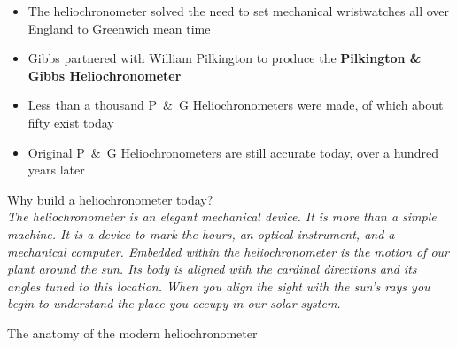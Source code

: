 \documentclass[final]{beamer}
\begin{document}
\begin{frame}
\begin{columns}[t]
\begin{column}[t]{0.24 \textwidth}
\begin{itemize}
\item The heliochronometer solved the need to set mechanical
  wristwatches all over England to Greenwich mean time 

\begin{center}
\end{center}

\item Gibbs partnered with William Pilkington to produce the 
{\bf Pilkington \& Gibbs Heliochronometer}


\item Less than a thousand \mbox{P \& G} Heliochronometers were
  made, of which about fifty exist today

\item Original \mbox{P \& G} Heliochronometers are still accurate today, over a hundred years later
\end{itemize}

\vspace*{.5in}

\alert{Why build a heliochronometer today?}
\vspace*{.5in}\\

\emph{ The heliochronometer is an elegant mechanical device. It is
  more than a simple machine. It is a device to mark the hours, an
  optical instrument, and a mechanical computer. Embedded within the
  heliochronometer is the motion of our plant around the sun. Its body
  is aligned with the cardinal directions and its angles tuned to this
  location. When you align the sight with the sun's rays you begin to
  understand the place you occupy in our solar system.  }
\vspace*{1in}

\alert{The anatomy of the modern heliochronometer}


\end{column}
\end{columns}
\end{frame}
\end{document}
